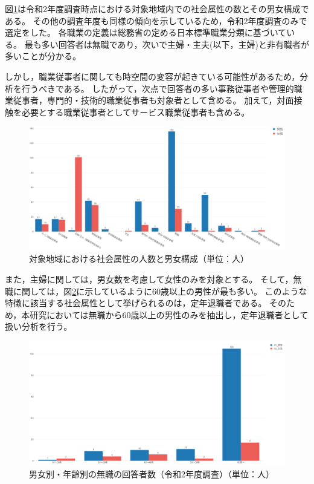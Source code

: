 \documentclass[paper={210mm,297mm},fontsize=15Q,line_length=35zw,number_of_lines=31,head_space=30mm,gutter=40mm,baselineskip=2.0zw,headfoot_verticalposition=1.5zw]{jlreq}
\begin{document}
図\ref{対象地域内における社会属性の人数と男女構成}は令和2年度調査時点における対象地域内での社会属性の数とその男女構成である。
その他の調査年度も同様の傾向を示しているため，令和2年度調査のみで選定をした。
各職業の定義は総務省の定める日本標準職業分類に基づいている。
最も多い回答者は無職であり，次いで主婦・主夫(以下，主婦)と非有職者が多いことが分かる。

しかし，職業従事者に関しても時空間の変容が起きている可能性があるため，分析を行うべきである。
したがって，次点で回答者の多い事務従事者や管理的職業従事者，専門的・技術的職業従事者も対象者として含める。
加えて，対面接触を必要とする職業従事者としてサービス職業従事者も含める。

\begin{figure}[H]
  \centering
  \includegraphics[width=120mm]{../Figure/c02s01_fig_対象地域内における社会属性の人数とその男女構成_2020.png}
  \caption{対象地域における社会属性の人数と男女構成（単位：人）} %
  \label{対象地域内における社会属性の人数と男女構成}
\end{figure}

また，主婦に関しては，男女数を考慮して女性のみを対象とする。
そして，無職に関しては，図\ref{無職の回答者区分}に示しているように60歳以上の男性が最も多い。
このような特徴に該当する社会属性として挙げられるのは，定年退職者である。
そのため，本研究においては無職から60歳以上の男性のみを抽出し，定年退職者として扱い分析を行う。

\begin{figure}[H]
  \centering
  \includegraphics[width=120mm]{../Figure/c02s01_fig_定年退職者の選定.png}
  \caption{男女別・年齢別の無職の回答者数（令和2年度調査）（単位：人）} %
  \label{無職の回答者区分}
\end{figure}
\end{document}
